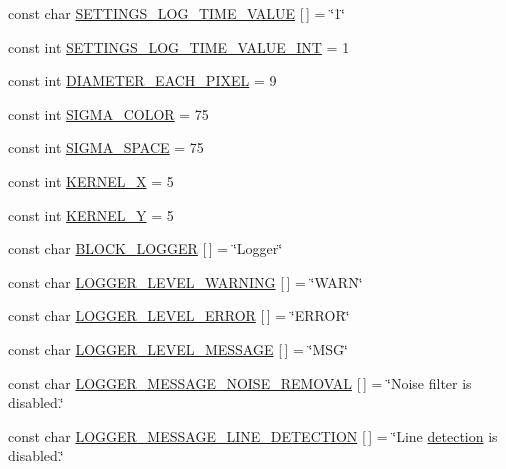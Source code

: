 \begin{DoxyCompactItemize}
\item 
const char \mbox{\hyperlink{namespaceyenot_ae00932245c3089d385ef8ee3463df8ca}{S\+E\+T\+T\+I\+N\+G\+S\+\_\+\+L\+O\+G\+\_\+\+T\+I\+M\+E\+\_\+\+V\+A\+L\+UE}} \mbox{[}$\,$\mbox{]} = \char`\"{}1\char`\"{}
\item 
const int \mbox{\hyperlink{namespaceyenot_abc8b052e7f097163709fa71c4da4478d}{S\+E\+T\+T\+I\+N\+G\+S\+\_\+\+L\+O\+G\+\_\+\+T\+I\+M\+E\+\_\+\+V\+A\+L\+U\+E\+\_\+\+I\+NT}} = 1
\item 
const int \mbox{\hyperlink{namespaceyenot_ad85720cad8409ab5ef5cc47afc84645c}{D\+I\+A\+M\+E\+T\+E\+R\+\_\+\+E\+A\+C\+H\+\_\+\+P\+I\+X\+EL}} = 9
\item 
const int \mbox{\hyperlink{namespaceyenot_affd7404833d15c98fbd85249f43f98da}{S\+I\+G\+M\+A\+\_\+\+C\+O\+L\+OR}} = 75
\item 
const int \mbox{\hyperlink{namespaceyenot_ad45191f613b95ca3398e6eab5e202406}{S\+I\+G\+M\+A\+\_\+\+S\+P\+A\+CE}} = 75
\item 
const int \mbox{\hyperlink{namespaceyenot_aa753d0e3e99fb4b37b3930996bdfe563}{K\+E\+R\+N\+E\+L\+\_\+X}} = 5
\item 
const int \mbox{\hyperlink{namespaceyenot_a33a5af73a30e2b5684ee02cc4bf4c374}{K\+E\+R\+N\+E\+L\+\_\+Y}} = 5
\item 
const char \mbox{\hyperlink{namespaceyenot_a73be0cdcde2af378cd4043f56d4776e2}{B\+L\+O\+C\+K\+\_\+\+L\+O\+G\+G\+ER}} \mbox{[}$\,$\mbox{]} = \char`\"{}Logger\char`\"{}
\item 
const char \mbox{\hyperlink{namespaceyenot_a1133c576c0c3eebe5aa6c43529a56f21}{L\+O\+G\+G\+E\+R\+\_\+\+L\+E\+V\+E\+L\+\_\+\+W\+A\+R\+N\+I\+NG}} \mbox{[}$\,$\mbox{]} = \char`\"{}W\+A\+RN\char`\"{}
\item 
const char \mbox{\hyperlink{namespaceyenot_a08c0d88b074bcba3b7d79d019211a1ac}{L\+O\+G\+G\+E\+R\+\_\+\+L\+E\+V\+E\+L\+\_\+\+E\+R\+R\+OR}} \mbox{[}$\,$\mbox{]} = \char`\"{}E\+R\+R\+OR\char`\"{}
\item 
const char \mbox{\hyperlink{namespaceyenot_a75d435531623705520a8bd478ae6e3ed}{L\+O\+G\+G\+E\+R\+\_\+\+L\+E\+V\+E\+L\+\_\+\+M\+E\+S\+S\+A\+GE}} \mbox{[}$\,$\mbox{]} = \char`\"{}M\+SG\char`\"{}
\item 
const char \mbox{\hyperlink{namespaceyenot_ae3c6bd195ef1c9bdcbd48e5b44e17aaf}{L\+O\+G\+G\+E\+R\+\_\+\+M\+E\+S\+S\+A\+G\+E\+\_\+\+N\+O\+I\+S\+E\+\_\+\+R\+E\+M\+O\+V\+AL}} \mbox{[}$\,$\mbox{]} = \char`\"{}Noise filter is disabled.\char`\"{}
\item 
const char \mbox{\hyperlink{namespaceyenot_a3cc24a045a30435ab78be6014ff26a16}{L\+O\+G\+G\+E\+R\+\_\+\+M\+E\+S\+S\+A\+G\+E\+\_\+\+L\+I\+N\+E\+\_\+\+D\+E\+T\+E\+C\+T\+I\+ON}} \mbox{[}$\,$\mbox{]} = \char`\"{}Line \mbox{\hyperlink{group__coreh_ga0ef39a5ada0921b3abf8906957746b86}{detection}} is disabled.\char`\"{}

\end{DoxyCompactItemize}
